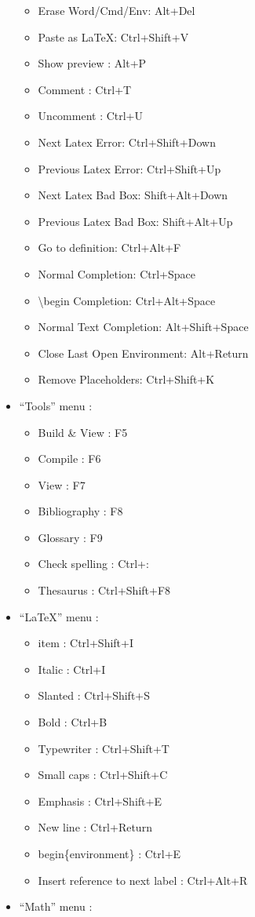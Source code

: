 \documentclass[10pt,legalpaper,twocolumn]{article}
\begin{document}
\begin{itemize}
  \begin{itemize}
  \itemsep1pt\parskip0pt
  \item
    Erase Word/Cmd/Env: Alt+Del
  \item
    Paste as LaTeX: Ctrl+Shift+V
  \item
    Show preview : Alt+P
  \item
    Comment : Ctrl+T
  \item
    Uncomment : Ctrl+U
  \item
    Next Latex Error: Ctrl+Shift+Down
  \item
    Previous Latex Error: Ctrl+Shift+Up
  \item
    Next Latex Bad Box: Shift+Alt+Down
  \item
    Previous Latex Bad Box: Shift+Alt+Up
  \item
    Go to definition: Ctrl+Alt+F
  \item
    Normal Completion: Ctrl+Space
  \item
    \textbackslash{}begin Completion: Ctrl+Alt+Space
  \item
    Normal Text Completion: Alt+Shift+Space
  \item
    Close Last Open Environment: Alt+Return
  \item
    Remove Placeholders: Ctrl+Shift+K
  \end{itemize}
\item
  ``Tools'' menu :

  \begin{itemize}
  \itemsep1pt\parskip0pt
  \item
    Build \& View : F5
  \item
    Compile : F6
  \item
    View : F7
  \item
    Bibliography : F8
  \item
    Glossary : F9
  \item
    Check spelling : Ctrl+:
  \item
    Thesaurus : Ctrl+Shift+F8
  \end{itemize}
\item
  ``LaTeX'' menu :

  \begin{itemize}
  \itemsep1pt\parskip0pt
  \item
    item : Ctrl+Shift+I
  \item
    Italic : Ctrl+I
  \item
    Slanted : Ctrl+Shift+S
  \item
    Bold : Ctrl+B
  \item
    Typewriter : Ctrl+Shift+T
  \item
    Small caps : Ctrl+Shift+C
  \item
    Emphasis : Ctrl+Shift+E
  \item
    New line : Ctrl+Return
  \item
    begin\{environment\} : Ctrl+E
  \item
    Insert reference to next label : Ctrl+Alt+R
  \end{itemize}
\item
  ``Math'' menu :


\end{itemize}
\end{document}
